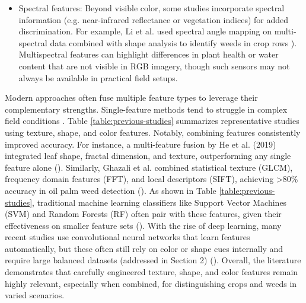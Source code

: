 \documentclass[letterpaper]{report}
\begin{document}
\begin{itemize}
	\item{Spectral features: Beyond visible color, some studies incorporate spectral information (e.g. near-infrared reflectance or vegetation indices) for added discrimination. For example, Li et al. used spectral angle mapping on multi-spectral data combined with shape analysis to identify weeds in crop rows \parencite{Wu2021-gt}). Multispectral features can highlight differences in plant health or water content that are not visible in RGB imagery, though such sensors may not always be available in practical field setups. }
\end{itemize} 

Modern approaches often fuse multiple feature types to leverage their complementary strengths. Single-feature methods tend to struggle in complex field conditions \parencite{Wu2021-gt}. Table \ref{table:previous-studies} summarizes representative studies using texture, shape, and color features. Notably, combining features consistently improved accuracy. For instance, a multi-feature fusion by He et al. (2019) integrated leaf shape, fractal dimension, and texture, outperforming any single feature alone (\cite{Wu2021-gt}). Similarly, Ghazali et al. combined statistical texture (GLCM), frequency domain features (FFT), and local descriptors (SIFT), achieving >80\% accuracy in oil palm weed detection (\cite{Wu2021-gt}). As shown in Table \ref{table:previous-studies}, traditional machine learning classifiers like Support Vector Machines (SVM) and Random Forests (RF) often pair with these features, given their effectiveness on smaller feature sets (\cite{Wu2021-gt}). With the rise of deep learning, many recent studies use convolutional neural networks that learn features automatically, but these often still rely on color or shape cues internally and require large balanced datasets (addressed in Section 2) (\cite{Wu2021-gt}). Overall, the literature demonstrates that carefully engineered texture, shape, and color features remain highly relevant, especially when combined, for distinguishing crops and weeds in varied scenarios.
\end{document}
